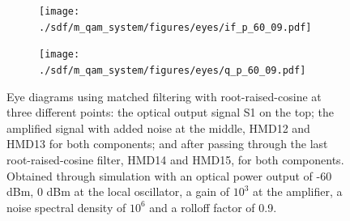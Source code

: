 \begin{figure}[H]
	\centering
	\begin{subfigure}{.45\textwidth}
		\centering
		\texttt{[image: ./sdf/m\_qam\_system/figures/eyes/if\_p\_60\_09.pdf]}
	\end{subfigure}
	\begin{subfigure}{.45\textwidth}
		\centering
		\texttt{[image: ./sdf/m\_qam\_system/figures/eyes/q\_p\_60\_09.pdf]}
	\end{subfigure}
	
	\caption{Eye diagrams using matched filtering with root-raised-cosine at three different points: the optical output signal S1 on the top; the amplified signal with added noise at the middle, HMD12 and HMD13 for both components; and after passing through the last root-raised-cosine filter, HMD14 and HMD15, for both components. Obtained through simulation with an optical power output of -60 dBm, 0 dBm at the local oscillator, a gain of $10^3$ at the amplifier, a noise spectral density of $10^6$ and a rolloff factor of 0.9.}
	\label{fig:test}
\end{figure}


